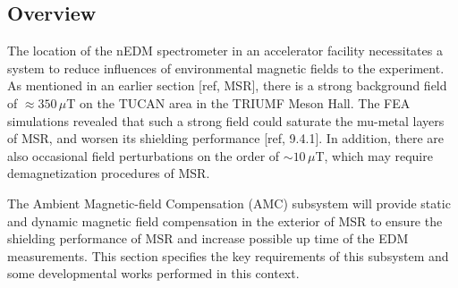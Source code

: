 \subsection{Overview}
The location of the nEDM spectrometer in an accelerator facility necessitates a system to reduce influences of environmental magnetic fields to the experiment. As mentioned in an earlier section [ref, MSR], there is a strong background field of $\approx 350\,\mu$T on the TUCAN area in the TRIUMF Meson Hall. The FEA simulations revealed that such a strong field could saturate the mu-metal layers of MSR, and worsen its shielding performance [ref, 9.4.1]. In addition, there are also occasional field perturbations on the order of $\sim 10\,\mu$T, which may require demagnetization procedures of MSR. 

The Ambient Magnetic-field Compensation (AMC) subsystem will provide static and dynamic magnetic field compensation in the exterior of MSR to ensure the shielding performance of MSR and increase possible  up time of the EDM measurements. This section specifies the key requirements of this subsystem and some developmental works performed in this context.  

